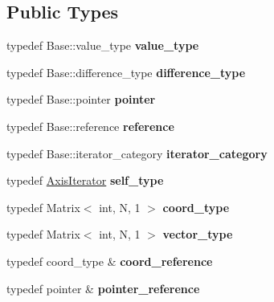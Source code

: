 \subsection*{Public Types}
\begin{DoxyCompactItemize}
\item 
\hypertarget{class_d_o_1_1_axis_iterator_a758d02a5183e542558cd2f7ad65c683c}{typedef Base\-::value\-\_\-type {\bfseries value\-\_\-type}}\label{class_d_o_1_1_axis_iterator_a758d02a5183e542558cd2f7ad65c683c}

\item 
\hypertarget{class_d_o_1_1_axis_iterator_aa4336e7fd692b20bda7b7227fa9c9f55}{typedef Base\-::difference\-\_\-type {\bfseries difference\-\_\-type}}\label{class_d_o_1_1_axis_iterator_aa4336e7fd692b20bda7b7227fa9c9f55}

\item 
\hypertarget{class_d_o_1_1_axis_iterator_aa2158dc2d25210ef557a40d3b8a521e3}{typedef Base\-::pointer {\bfseries pointer}}\label{class_d_o_1_1_axis_iterator_aa2158dc2d25210ef557a40d3b8a521e3}

\item 
\hypertarget{class_d_o_1_1_axis_iterator_abaed3f9c23f38a6baedf841296fa931c}{typedef Base\-::reference {\bfseries reference}}\label{class_d_o_1_1_axis_iterator_abaed3f9c23f38a6baedf841296fa931c}

\item 
\hypertarget{class_d_o_1_1_axis_iterator_a61a96ce54a0b0407ce9bdd9d3f0e3934}{typedef Base\-::iterator\-\_\-category {\bfseries iterator\-\_\-category}}\label{class_d_o_1_1_axis_iterator_a61a96ce54a0b0407ce9bdd9d3f0e3934}

\item 
\hypertarget{class_d_o_1_1_axis_iterator_a94654f697ba0037a85b8a976f648c3fd}{typedef \hyperlink{class_d_o_1_1_axis_iterator}{Axis\-Iterator} {\bfseries self\-\_\-type}}\label{class_d_o_1_1_axis_iterator_a94654f697ba0037a85b8a976f648c3fd}

\item 
\hypertarget{class_d_o_1_1_axis_iterator_ae4fb477425bbeb20329d300396ac2582}{typedef Matrix$<$ int, N, 1 $>$ {\bfseries coord\-\_\-type}}\label{class_d_o_1_1_axis_iterator_ae4fb477425bbeb20329d300396ac2582}

\item 
\hypertarget{class_d_o_1_1_axis_iterator_aacf98e49e90f9aeead0ff8885fae3ac7}{typedef Matrix$<$ int, N, 1 $>$ {\bfseries vector\-\_\-type}}\label{class_d_o_1_1_axis_iterator_aacf98e49e90f9aeead0ff8885fae3ac7}

\item 
\hypertarget{class_d_o_1_1_axis_iterator_ae3ee468a9ca692fbed522f9eb22a1bd8}{typedef coord\-\_\-type \& {\bfseries coord\-\_\-reference}}\label{class_d_o_1_1_axis_iterator_ae3ee468a9ca692fbed522f9eb22a1bd8}

\item 
\hypertarget{class_d_o_1_1_axis_iterator_aa7d96038ae86b2607b1c75e8d8ff4797}{typedef pointer \& {\bfseries pointer\-\_\-reference}}\label{class_d_o_1_1_axis_iterator_aa7d96038ae86b2607b1c75e8d8ff4797}

\end{DoxyCompactItemize}
